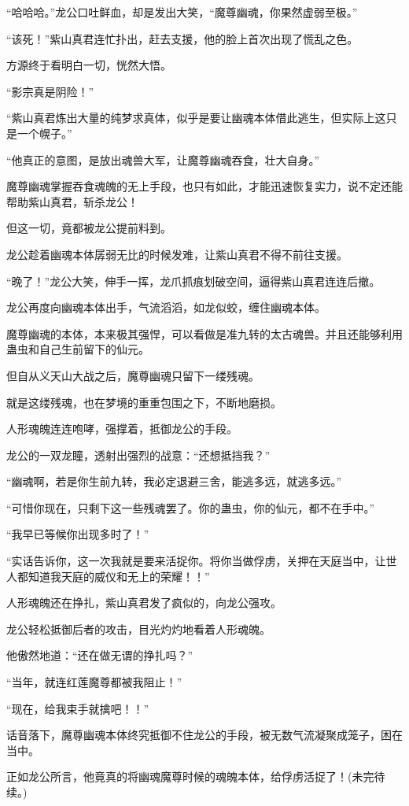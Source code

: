\begin{this_body}
“哈哈哈。”龙公口吐鲜血，却是发出大笑，“魔尊幽魂，你果然虚弱至极。”

“该死！”紫山真君连忙扑出，赶去支援，他的脸上首次出现了慌乱之色。

方源终于看明白一切，恍然大悟。

“影宗真是阴险！”

“紫山真君炼出大量的纯梦求真体，似乎是要让幽魂本体借此逃生，但实际上这只是一个幌子。”

“他真正的意图，是放出魂兽大军，让魔尊幽魂吞食，壮大自身。”

魔尊幽魂掌握吞食魂魄的无上手段，也只有如此，才能迅速恢复实力，说不定还能帮助紫山真君，斩杀龙公！

但这一切，竟都被龙公提前料到。

龙公趁着幽魂本体孱弱无比的时候发难，让紫山真君不得不前往支援。

“晚了！”龙公大笑，伸手一挥，龙爪抓痕划破空间，逼得紫山真君连连后撤。

龙公再度向幽魂本体出手，气流滔滔，如龙似蛟，缠住幽魂本体。

魔尊幽魂的本体，本来极其强悍，可以看做是准九转的太古魂兽。并且还能够利用蛊虫和自己生前留下的仙元。

但自从义天山大战之后，魔尊幽魂只留下一缕残魂。

就是这缕残魂，也在梦境的重重包围之下，不断地磨损。

人形魂魄连连咆哮，强撑着，抵御龙公的手段。

龙公的一双龙瞳，透射出强烈的战意：“还想抵挡我？”

“幽魂啊，若是你生前九转，我必定退避三舍，能逃多远，就逃多远。”

“可惜你现在，只剩下这一些残魂罢了。你的蛊虫，你的仙元，都不在手中。”

“我早已等候你出现多时了！”

“实话告诉你，这一次我就是要来活捉你。将你当做俘虏，关押在天庭当中，让世人都知道我天庭的威仪和无上的荣耀！！”

人形魂魄还在挣扎，紫山真君发了疯似的，向龙公强攻。

龙公轻松抵御后者的攻击，目光灼灼地看着人形魂魄。

他傲然地道：“还在做无谓的挣扎吗？”

“当年，就连红莲魔尊都被我阻止！”

“现在，给我束手就擒吧！！”

话音落下，魔尊幽魂本体终究抵御不住龙公的手段，被无数气流凝聚成笼子，困在当中。

正如龙公所言，他竟真的将幽魂魔尊时候的魂魄本体，给俘虏活捉了！(未完待续。)

\end{this_body}


